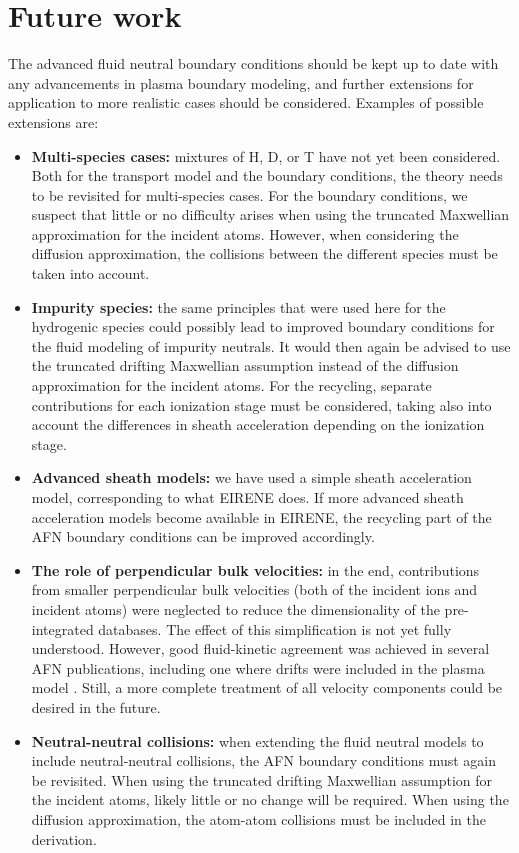 \chapter{Future work}

The advanced fluid neutral boundary conditions should be kept up to date with any advancements in plasma boundary modeling, and further extensions for application to more realistic cases should be considered. Examples of possible extensions are:

\begin{itemize}
    \item \textbf{Multi-species cases:} mixtures of H, D, or T have not yet been considered. Both for the transport model and the boundary conditions, the theory needs to be revisited for multi-species cases. For the boundary conditions, we suspect that little or no difficulty arises when using the truncated Maxwellian approximation for the incident atoms. However, when considering the diffusion approximation, the collisions between the different species must be taken into account.
    \item \textbf{Impurity species:} the same principles that were used here for the hydrogenic species could possibly lead to improved boundary conditions for the fluid modeling of impurity neutrals. It would then again be advised to use the truncated drifting Maxwellian assumption instead of the diffusion approximation for the incident atoms. For the recycling, separate contributions for each ionization stage must be considered, taking also into account the differences in sheath acceleration depending on the ionization stage.
    \item \textbf{Advanced sheath models:} we have used a simple sheath acceleration model, corresponding to what EIRENE does. If more advanced sheath acceleration models become available in EIRENE, the recycling part of the AFN boundary conditions can be improved accordingly.
    \item \textbf{The role of perpendicular bulk velocities:} in the end, contributions from smaller perpendicular bulk velocities (both of the incident ions and incident atoms) were neglected to reduce the dimensionality of the pre-integrated databases. The effect of this simplification is not yet fully understood. However, good fluid-kinetic agreement was achieved in several AFN publications, including one where drifts were included in the plasma model \cite{psi_wim}. Still, a more complete treatment of all velocity components could be desired in the future.
    \item \textbf{Neutral-neutral collisions:} when extending the fluid neutral models to include neutral-neutral collisions, the AFN boundary conditions must again be revisited. When using the truncated drifting Maxwellian assumption for the incident atoms, likely little or no change will be required. When using the diffusion approximation, the atom-atom collisions must be included in the derivation.

\end{itemize}

